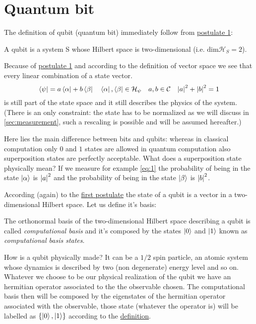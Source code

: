 \section{Quantum bit}
The definition of qubit (quantum bit) immediately follow from \hyperref[postulate:1]{postulate 1}:
\begin{defn}
A qubit is a system S whose Hilbert space is two-dimensional (i.e. $\text{dim}\mathcal{H}_S = 2$).
\end{defn}
Because of \hyperref[postulate:1]{postulate 1} and according to the definition of vector space we see that every linear combination of a state vector.
\begin{equation}\label{eq:1}
    \bra{\psi} = a \bra{\alpha} + b \bra{\beta} \quad \bra{\alpha},\bra{\beta} \in \mathcal{H}_\psi \quad a,b \in \mathcal{C} \quad \abs{a}^2 + \abs{b}^2 = 1
\end{equation}
is still part of the state space and it still describes the physics of the system. (There is an only constraint: the state has to be normalized as we will discuss in \ref{sec:measurement}, such a rescaling is possible and will be assumed hereafter.) 

Here lies the main difference between bits and qubits: whereas in classical computation only $0$ and $1$ states are allowed in quantum computation also superposition states are perfectly acceptable. What does a superposition state physically mean? If we measure for example \ref{eq:1} the probability of being in the state $\ket{\alpha}$ is  $\abs{a}^2$ and the probability of being in the state $\ket{\beta}$ is $\abs{b}^2$.

According (again) to the \hyperref[postulate:1]{first postulate} the state of a qubit is a vector in a two-dimensional Hilbert space. Let us define it's basis:
\begin{defn}\label{def:computational-basis}
The orthonormal basis of the two-dimensional Hilbert space describing a qubit is called \emph{computational basis} and it's composed by the states $\ket{0}$ and $\ket{1}$ known as \emph{computational basis states}.
\end{defn}
How is a qubit physically made?
It can be a $1/2$ spin particle, an atomic system whose dynamics is described by two (non degenerate) energy level and so on.
Whatever we choose to be our physical realization of the qubit we have an hermitian operator associated to the the observable chosen. The computational basis then will be composed by the eigenstates of the hermitian operator associated with the observable, those state (whatever the operator is) will be labelled as $\{\ket{0},\ket{1}\}$ according to the \hyperref[def:computational-basis]{definition}.

